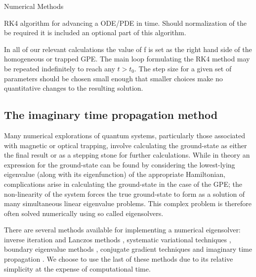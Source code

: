 \begin{chapter}{\label{cha:numerics}Numerical Methods}
\begin{algorithm}[H]
{			
		}
	\caption{RK4 algorithm for advancing a ODE/PDE in time. Should normalization of the be required it is included an optional part of this algorithm.}\label{algo_rk4}
	\end{algorithm}

	In all of our relevant calculations the value of f is set as the right hand side of the homogeneous or trapped GPE. The main loop formulating the RK4 method may be repeated indefinitely to reach any $t>t_0$. The step size for a given set of parameters should be chosen small enough that smaller choices make no quantitative changes to the resulting solution.

	\subsection{\label{section:imagTime} The imaginary time propagation method}
	Many numerical explorations of quantum systems, particularly those associated with magnetic or optical trapping,  involve calculating the ground-state as either the final result or as a stepping stone for further calculations. While in theory an expression for the ground-state can be found by considering the lowest-lying eigenvalue (along with its eigenfunction) of the appropriate Hamiltonian, complications arise in calculating the ground-state in the case of the GPE; the non-linearity of the system forces the true ground-state to form as a solution of many simultaneous linear eigenvalue problems.	This complex problem is therefore often solved numerically using so called eigensolvers.

	There are several methods available for implementing a numerical eigensolver: inverse iteration and Lanczos methods \cite{thijssen1999computational}, systematic variational techniques \cite{Bao2003230}, boundary eigenvalue methods \cite{Edwards95}, conjugate gradient techniques \cite{NumericalRecipes} and imaginary time propagation \cite{PhysRevE.62.7438}. We choose to use the last of these methods due to its relative simplicity at the expense of computational time.


\end{chapter}
